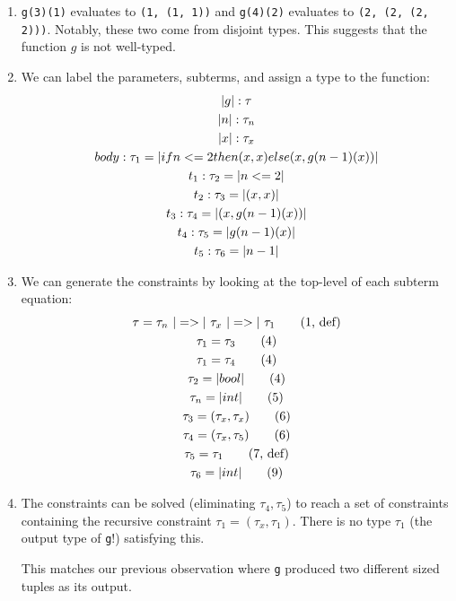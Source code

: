 \begin{exercise}{}
  \begin{solution}
    \begin{enumerate}
      \item \lstinline|g(3)(1)| evaluates to \lstinline|(1, (1, 1))| and
      \lstinline|g(4)(2)| evaluates to \lstinline|(2, (2, (2, 2)))|. Notably,
      these two come from disjoint types. This suggests that the function \(g\)
      is not well-typed.
      \item We can label the parameters, subterms, and assign a type to the
      function:
      \setcounter{equation}{0}
      \begin{gather}
        \lstinline|g|: \tau \\
        \lstinline|n|: \tau_n \\
        \lstinline|x|: \tau_x \\
        body: \tau_1 = \lstinline|if n <=  2 then (x, x)  else (x, g(n - 1)(x))| \\
        t_1: \tau_2 = \lstinline|n <=  2| \\
        t_2: \tau_3 = \lstinline|(x, x)| \\
        t_3: \tau_4 = \lstinline|(x, g(n - 1)(x))| \\
        t_4: \tau_5 = \lstinline|g(n - 1)(x)| \\
        t_5: \tau_6 = \lstinline|n - 1|
      \end{gather}
      \item We can generate the constraints by looking at the top-level of each
      subterm equation:
      \begin{gather*}
        \tau = \tau_n ~\ato~ \tau_x ~\ato~ \tau_1 \tag{1, def} \\
        \tau_1 = \tau_3 \tag{4} \\
        \tau_1 = \tau_4 \tag{4} \\
        \tau_2 = \abool \tag{4} \\
        \tau_n = \aint \tag{5} \\
        \tau_3 = (\tau_x, \tau_x) \tag{6} \\
        \tau_4 = (\tau_x, \tau_5) \tag{6} \\
        \tau_5 = \tau_1 \tag{7, def} \\
        \tau_6 = \aint \tag{9}
      \end{gather*}
      \item The constraints can be solved (eliminating \(\tau_4, \tau_5\)) to
      reach a set of constraints containing the recursive constraint \(\tau_1 =
      (\tau_x, \tau_1)\). There is no type \(\tau_1\) (the output type of
      \lstinline|g|!) satisfying this. 

      This matches our previous observation where \lstinline|g| produced two
      different sized tuples as its output. 
    \end{enumerate}
  \end{solution}
  
\end{exercise}
